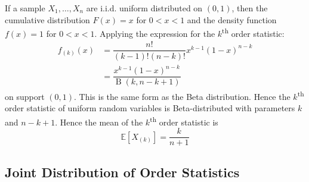 \documentclass[11pt]{report} %
\begin{document}
If a sample $X_{1}, \dots, X_{n}$ are i.i.d. uniform distributed on $\left(0, 1\right)$, then the cumulative distribution $F\left(x\right) = x$ for $0 < x < 1$ and the density function $f\left(x\right) = 1$ for $0 < x < 1$. Applying the expression for the $k$\textsuperscript{th} order statistic:
\begin{align}
f_{\left(k\right)}\left(x\right) &= \dfrac{n!}{\left(k - 1\right)!\left(n - k\right)!}x^{k - 1}\left(1 - x\right)^{n - k} \\
&= \dfrac{x^{k - 1}\left(1 - x\right)^{n - k}}{\operatorname{B}\left(k, n - k + 1\right)}
\end{align}
on support $\left(0, 1\right)$. This is the same form as the Beta distribution. Hence the $k$\textsuperscript{th} order statistic of uniform random variables is Beta-distributed with parameters $k$ and $n - k + 1$. Hence the mean of the $k$\textsuperscript{th} order statistic is
\begin{equation}
\mathbb{E}\left[X_{\left(k\right)}\right] = \dfrac{k}{n + 1}
\end{equation}

\subsection{Joint Distribution of Order Statistics}
\end{document}
